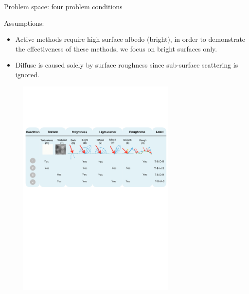 \documentclass[10pt]{beamer}
\begin{document}
\begin{frame}{Problem space: four problem conditions}

Assumptions:
\begin{itemize}
\item Active methods require high surface albedo (bright), in order to demonstrate the effectiveness of these methods, we focus on bright surfaces only.
\item Diffuse is caused solely by surface roughness since sub-surface scattering is ignored.
\end{itemize}

\begin{figure}[h]
\includegraphics[width=0.7\textwidth]{prob_space/prob_cond}
\end{figure}

\end{frame}

\end{document}
